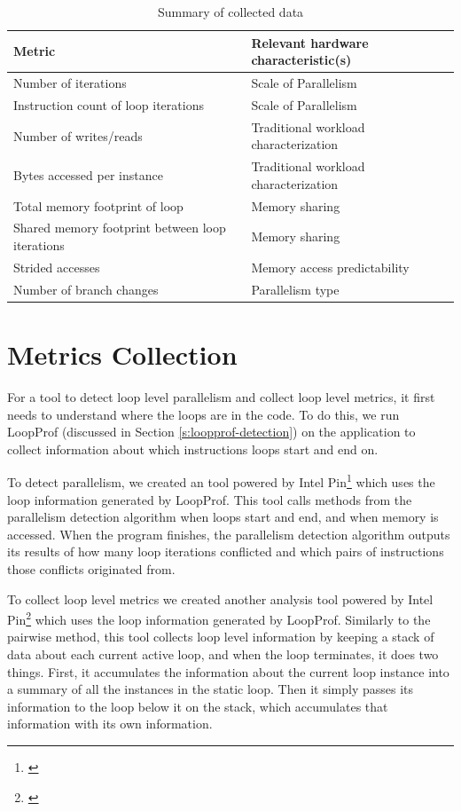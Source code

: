 \documentclass[12pt,twoside]{reedthesis}
\begin{document}
		\begin{table}[h]
			\caption{Summary of collected data}
			\label{table:sum-data}
		\begin{tabular}{ |p{6cm}|p{7cm}| }
			\hline
			Metric & Relevant hardware characteristic(s) \\
			\hline \hline
			Number of iterations & Scale of Parallelism \\
			\hline
			Instruction count of loop iterations  & Scale of Parallelism \\
			\hline
			Number of writes/reads & Traditional workload characterization \\
			\hline
			Bytes accessed per instance & Traditional workload characterization \\
			\hline
			Total memory footprint of loop & Memory sharing  \\
			\hline
			Shared memory footprint between loop iterations & Memory sharing \\
			\hline
			Strided accesses  & Memory access predictability \\
			\hline
			Number of branch changes & Parallelism type\\
			\hline
		\end{tabular}
		\end{table}
	



	\section{Metrics Collection}
	
		For a tool to detect loop level parallelism and collect loop level metrics, it first needs to understand where the loops are in the code. To do this, we run LoopProf (discussed in Section \ref{s:loopprof-detection}) on the application to collect information about which instructions loops start and end on. 
		
		To detect parallelism, we created an tool powered by Intel Pin\footnote{\cite{Luk:2005}} which uses the loop information generated by LoopProf. This tool calls methods from the parallelism detection algorithm when loops start and end, and when memory is accessed. When the program finishes, the parallelism detection algorithm outputs its results of how many loop iterations conflicted and which pairs of instructions those conflicts originated from. 
		
		To collect loop level metrics we created another analysis tool powered by Intel Pin\footnote{\cite{Luk:2005}} which uses the loop information generated by LoopProf. 
		Similarly to the pairwise method, this tool collects loop level information by keeping a stack of data about each current active loop, and when the loop terminates, it does two things. First, it accumulates the information about the current loop instance into a summary of all the instances in the static loop. Then it simply passes its information to the loop below it on the stack, which accumulates that information with its own information. 
		
\end{document}
